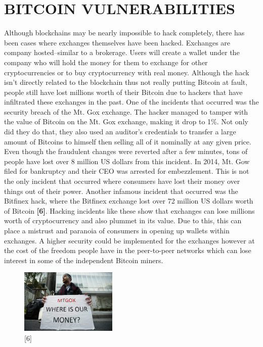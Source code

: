 \documentclass[letterpaper, 10 pt, conference]{ieeeconf}  %
\begin{document}
\section{BITCOIN VULNERABILITIES}
Although blockchains may be nearly impossible to hack completely, there has been cases where exchanges themselves have been hacked. Exchanges are company hosted--similar to a brokerage. Users will create a wallet under the company who will hold the money for them to exchange for other cryptocurrencies or to buy cryptocurrency with real money. Although the hack isn't directly related to the blockchain thus not really putting Bitcoin at fault, people still have lost millions worth of their Bitcoin due to hackers that have infiltrated these exchanges in the past. One of the incidents that occurred was the security breach of the Mt. Gox exchange. The hacker managed to tamper with the value of Bitcoin on the Mt. Gox exchange, making it drop to 1\%. Not only did they do that, they also used an auditor's credentials to transfer a large amount of Bitcoins to himself then selling all of it nominally at any given price. Even though the fraudulent changes were reverted after a few minutes, tons of people have lost over 8 million US dollars from this incident. In 2014, Mt. Gow filed for bankruptcy and their CEO was arrested for embezzlement. This is not the only incident that occurred where consumers have lost their money over things out of their power. Another infamous incident that occurred was the Bitfinex hack, where the Bitfinex exchange lost over 72 million US dollars worth of Bitcoin \textbf{[6]}. Hacking incidents like these show that exchanges can lose millions worth of cryptocurrency and also plummet in its value. Due to this, this can place a mistrust and paranoia of consumers in opening up wallets within exchanges. A higher security could be implemented for the exchanges however at the cost of the freedom people have in the peer-to-peer networks which can lose interest in some of the independent Bitcoin miners. 
\begin{figure}[h!]
  \includegraphics[width=4.6cm]{mtgox.jpg}
  \caption*{[6]}
\end{figure}

\newpage
\end{document}
